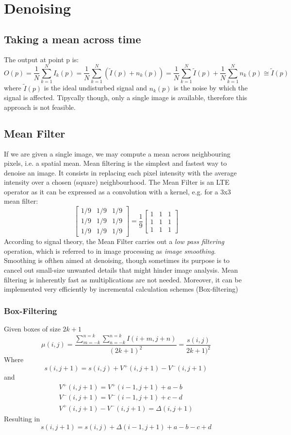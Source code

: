 \documentclass{article}
\begin{document}
\section{Denoising}
\subsection{Taking a mean across time}
The output at point p is:
\begin{equation}
    O(p)=\frac{1}{N} \sum_{k=1}^N I_k(p) = \frac{1}{N} \sum_{k=1}^N (\tilde{I}(p)+n_k(p)) = \frac{1}{N} \sum_{k=1}^N \tilde{I}(p) + \frac{1}{N} \sum_{k=1}^N n_k(p) \cong \tilde{I}(p)
\end{equation}
where $\tilde{I}(p)$ is the ideal undisturbed signal and $n_k(p)$ is the noise by which the signal is affected. Tipycally though, only a single image is available, therefore this approach is not feasible. 
\subsection{Mean Filter}
If we are given a single image, we may compute a mean across neighbouring pixels, i.e. a spatial mean. Mean filtering is the simplest and fastest way to denoise an image. It consists in replacing each pixel intensity with the average intensity over a chosen (square) neighbourhood. The Mean Filter is an LTE operator as it can be expressed as a convolution with a kernel, e.g. for a  3x3 mean filter:
\[
    \begin{bmatrix}
        1/9 & 1/9 & 1/9 \\
        1/9 & 1/9 & 1/9 \\
        1/9 & 1/9 & 1/9
        \end{bmatrix} = \frac{1}{9} \begin{bmatrix}
        1 & 1 & 1 \\
        1 & 1 & 1 \\
        1 & 1 & 1 
    \end{bmatrix}
\]
According to signal theory, the Mean Filter carries out a \emph{low pass filtering} operation, which is referred to in image processing as \emph{image smoothing}. Smoothing is ofthen aimed at denoising, though sometimes its purpose is to cancel out small-size unwanted details that might hinder image analysis. Mean filtering is inherently fast as multiplications are not needed. Moreover, it can be implemented very efficiently by incremental calculation schemes (Box-filtering)
\subsubsection{Box-Filtering}
Given boxes of size $2k+1$
\[
    \mu (i,j) = \frac{\sum_{m=-k}^{n=k}\sum_{n=-k}^{n=k} I(i+m,j+n)}{(2k+1)^2}=  \frac{s(i,j)}{2k+1)^2}
\]
Where
\[
    s(i,j+1)=s(i,j)+V^+(i,j+1)-V^-(i,j+1)
\]
and 
\begin{gather*}
    V^+(i,j+1)=V^+(i-1,j+1)+a-b\\
    V^-(i,j+1)=V^-(i-1,j+1)+c-d\\
    V^+(i,j+1)-V^-(i,j+1)=\Delta(i,j+1)
\end{gather*}
Resulting in
\[
    s(i,j+1)=s(i,j)+\Delta(i-1,j+1)+a-b-c+d
\]
\end{document}
